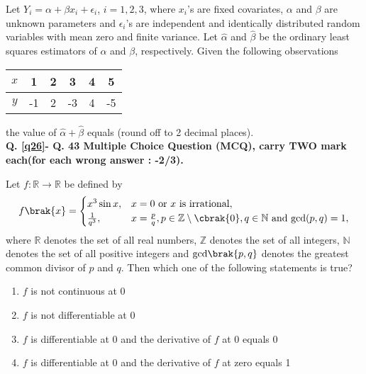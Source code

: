 \item Let $Y_i = \alpha + \beta x_i + \epsilon_i$, $i = 1, 2, 3$, where $x_i$'s are fixed covariates, $\alpha$ and $\beta$ are unknown parameters and $\epsilon_i$'s are independent and identically distributed random variables with mean zero and finite variance. Let $\hat{\alpha}$ and $\hat{\beta}$ be the ordinary least squares estimators of $\alpha$ and $\beta$, respectively. Given the following observations
 \begin{table}[h!]
     \centering
     \begin{tabular}[12pt]{|c|c|c|c|c|c|}
    \hline
    $x$ & 1 & 2 & 3 & 4 & 5 \\
    \hline
    $y$ & -1 & 2 & -3 & 4 & -5 \\
    \hline
\end{tabular}

 \end{table}
the value of $\hat{\alpha} + \hat{\beta}$ equals \underline{\hspace{1cm}} (round off to 2 decimal places).
\\ \textbf{ Q. \ref{q26}- Q. 43 Multiple Choice Question (MCQ), carry TWO mark each(for each wrong answer : -2/3).}
\item \label{q26} Let $f: \mathbb{R} \rightarrow \mathbb{R}$ be defined by
\begin{align*}
f\brak{x} =
\begin{cases}
x^3 \sin x, & x = 0 \text{ or } x \text{ is irrational}, \\
\frac{1}{q^3}, & x = \frac{p}{q}, p \in \mathbb{Z} \setminus \cbrak{0}, q \in \mathbb{N} \text{ and } \text{gcd}(p,q) = 1,
\end{cases}
\end{align*}
where $\mathbb{R}$ denotes the set of all real numbers, $\mathbb{Z}$ denotes the set of all integers, $\mathbb{N}$ denotes the set of all positive integers and $\text{gcd}\brak{p, q}$ denotes the greatest common divisor of $p$ and $q$. Then which one of the following statements is true?

\begin{enumerate}
\item $f$ is not continuous at 0
\item $f$ is not differentiable at 0
\item $f$ is differentiable at 0 and the derivative of $f$ at 0 equals 0
\item $f$ is differentiable at 0 and the derivative of $f$ at zero equals 1
\end{enumerate}

 
